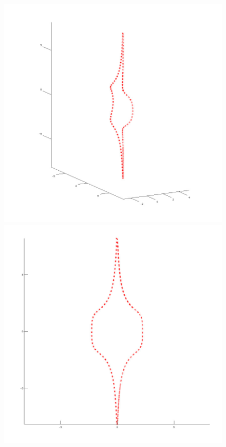 \documentclass[12pt]{article}
\begin{document}
\begin{minipage}{\textwidth}
\begin{figure}[H]
			\includegraphics[scale=0.32]{primer4_4}
			\includegraphics[scale=0.32]{primer4_3}
		\end{figure}
	\end{minipage}
	
\end{document}
